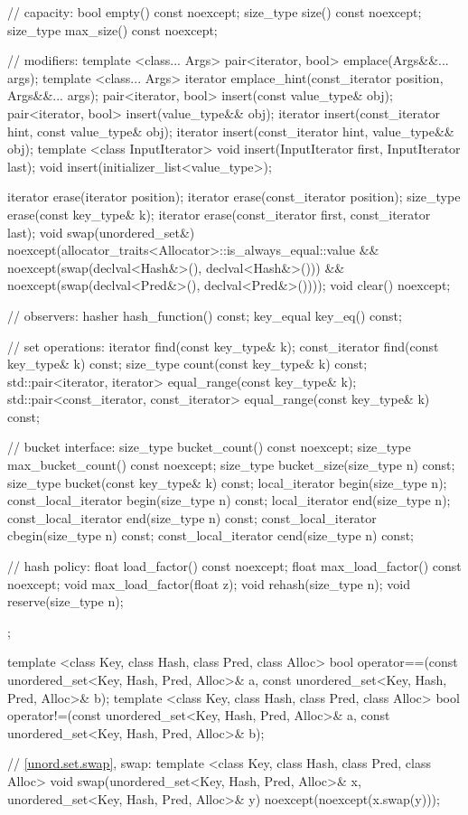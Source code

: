 \begin{codeblock}
{{    // capacity:
    bool      empty() const noexcept;
    size_type size() const noexcept;
    size_type max_size() const noexcept;

    // modifiers:
    template <class... Args> pair<iterator, bool> emplace(Args&&... args);
    template <class... Args> iterator emplace_hint(const_iterator position, Args&&... args);
    pair<iterator, bool> insert(const value_type& obj);
    pair<iterator, bool> insert(value_type&& obj);
    iterator insert(const_iterator hint, const value_type& obj);
    iterator insert(const_iterator hint, value_type&& obj);
    template <class InputIterator> void insert(InputIterator first, InputIterator last);
    void insert(initializer_list<value_type>);

    iterator  erase(iterator position);
    iterator  erase(const_iterator position);
    size_type erase(const key_type& k);
    iterator  erase(const_iterator first, const_iterator last);
    void      swap(unordered_set&)
      noexcept(allocator_traits<Allocator>::is_always_equal::value &&
               noexcept(swap(declval<Hash&>(), declval<Hash&>())) &&
               noexcept(swap(declval<Pred&>(), declval<Pred&>())));
    void      clear() noexcept;

    // observers:
    hasher hash_function() const;
    key_equal key_eq() const;

    // set operations:
    iterator       find(const key_type& k);
    const_iterator find(const key_type& k) const;
    size_type      count(const key_type& k) const;
    std::pair<iterator, iterator>             equal_range(const key_type& k);
    std::pair<const_iterator, const_iterator> equal_range(const key_type& k) const;

    // bucket interface:
    size_type bucket_count() const noexcept;
    size_type max_bucket_count() const noexcept;
    size_type bucket_size(size_type n) const;
    size_type bucket(const key_type& k) const;
    local_iterator begin(size_type n);
    const_local_iterator begin(size_type n) const;
    local_iterator end(size_type n);
    const_local_iterator end(size_type n) const;
    const_local_iterator cbegin(size_type n) const;
    const_local_iterator cend(size_type n) const;

    // hash policy:
    float load_factor() const noexcept;
    float max_load_factor() const noexcept;
    void max_load_factor(float z);
    void rehash(size_type n);
    void reserve(size_type n);
  };

  template <class Key, class Hash, class Pred, class Alloc>
    bool operator==(const unordered_set<Key, Hash, Pred, Alloc>& a,
                    const unordered_set<Key, Hash, Pred, Alloc>& b);
  template <class Key, class Hash, class Pred, class Alloc>
    bool operator!=(const unordered_set<Key, Hash, Pred, Alloc>& a,
                    const unordered_set<Key, Hash, Pred, Alloc>& b);

  // \ref{unord.set.swap}, swap:
  template <class Key, class Hash, class Pred, class Alloc>
    void swap(unordered_set<Key, Hash, Pred, Alloc>& x,
              unordered_set<Key, Hash, Pred, Alloc>& y)
      noexcept(noexcept(x.swap(y)));
}
\end{codeblock}

